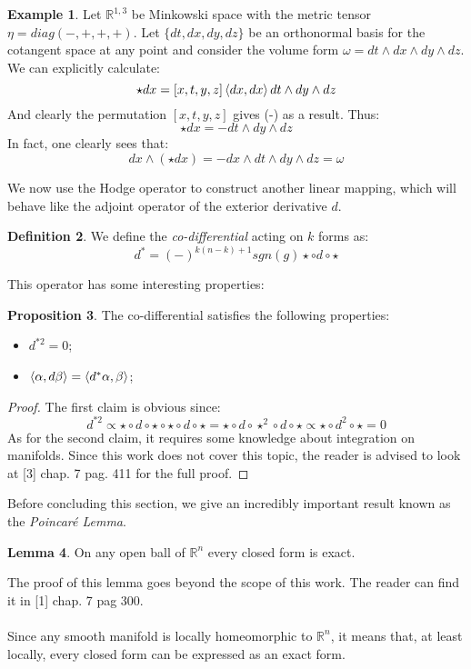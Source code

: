 \documentclass[12pt,a4paper]{report}
\theoremstyle{definition}
\newtheorem{Def}{Definition}[chapter]
\theoremstyle{Theorem}
\newtheorem{Prop}[Def]{Proposition}
\newtheorem{Lm}[Def]{Lemma}
\theoremstyle{definition}
\newtheorem{Ex}[Def]{Example}
\theoremstyle{definition}
\begin{document}
	\begin{Ex}
		Let $\mathbb{R}^{1,3}$ be Minkowski space with the metric tensor $\eta=diag(-,+,+,+)$. Let $\{dt,dx,dy,dz\}$ be an orthonormal basis for the cotangent space at any point and consider the volume form $\omega=dt\wedge dx\wedge dy\wedge dz$. We can explicitly calculate:
		$$\star dx=[x,t,y,z]\braket{dx,dx}dt\wedge dy\wedge dz$$
		And clearly the permutation $[x,t,y,z]$ gives (-) as a result. Thus:
		$$\star dx=-dt\wedge dy\wedge dz$$
		In fact, one clearly sees that:
		$$dx\wedge (\star dx)=-dx\wedge dt\wedge dy\wedge dz=\omega$$
	\end{Ex}
	We now use the Hodge operator to construct another linear mapping, which will behave like the adjoint operator of the exterior derivative $d$.
	\begin{Def}
		We define the \textit{co-differential} acting on $k$ forms as:
		$$d^*=(-)^{k(n-k)+1}sgn(g)\star \circ  d\circ\star$$
	\end{Def}
	This operator has some interesting properties:
	\begin{Prop}
		The co-differential satisfies the following properties:
		\begin{itemize}
			\item $d^{*2}=0$;
			\item $\braket{\alpha,d\beta}=\braket{d^*\alpha,\beta}$;
		\end{itemize}
	\end{Prop}
	\begin{proof}
		The first claim is obvious since:
		$$d^{*2}\propto\star \circ  d\circ\star\circ\star \circ  d\circ\star=\star \circ  d\circ\star^2\circ  d\circ\star\propto\star\circ d^2\circ\star=0$$
		As for the second claim, it requires some knowledge about integration on manifolds. Since this work does not cover this topic, the reader is advised to look at [3] chap. 7 pag. 411 for the full proof.
	\end{proof}
	Before concluding this section, we give an incredibly important result known as the \textit{Poincaré Lemma}.
	\begin{Lm}\label{P.L.}
		On any open ball of $\mathbb{R}^n$ every closed form is exact.
	\end{Lm}
	The proof of this lemma goes beyond the scope of this work. The reader can find it in [1] chap. 7 pag 300.\\
	\\
	Since any smooth manifold is locally homeomorphic to $\mathbb{R}^n$, it means that, at least locally, every closed form can be expressed as an exact form.
\end{document}

